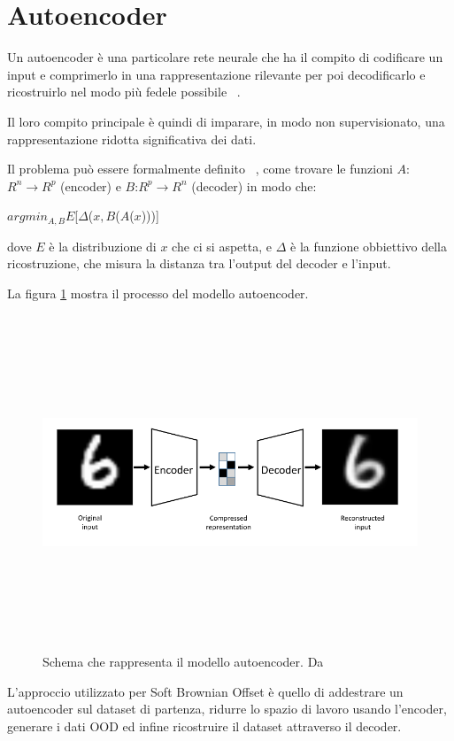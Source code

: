 \section{Autoencoder} 

Un autoencoder è una particolare rete neurale che ha il compito di codificare un input e comprimerlo in una rappresentazione rilevante per poi decodificarlo e ricostruirlo nel modo più fedele possibile ~\cite{bankAutoencoders2021}.

Il loro compito principale è quindi di imparare, in modo non supervisionato, una rappresentazione ridotta significativa dei dati.

Il problema può essere formalmente definito ~\cite{baldiAutoencodersUnsupervisedLearning}, come trovare le funzioni $A$:$ R^{n} \rightarrow R^p$ (encoder) e $B$:$ R^{p} \rightarrow R^n$ (decoder) in modo che:

\begin{center}
$arg min_{A,B} E$[$\Delta$($x,  B$($A$($x$)))] \\
\end{center}

dove $E$ è la distribuzione di $x$ che ci si aspetta, e $\Delta$ è la funzione obbiettivo della ricostruzione, che misura la distanza tra l'output del decoder e l'input.

La figura \ref{fig:ae_schema} mostra il processo del modello autoencoder.

\begin{figure}[htpb]
    \centering
    \includegraphics[width=\textwidth,height=10cm,keepaspectratio=true]{img/ae_schema.png}
    \caption{
        Schema che rappresenta il modello autoencoder. Da ~\cite{baldiAutoencodersUnsupervisedLearning}
    }
    \label{fig:ae_schema}
\end{figure}


L'approccio utilizzato per Soft Brownian Offset è quello di addestrare un autoencoder sul dataset di partenza, ridurre lo spazio di lavoro usando l'encoder, generare i dati OOD ed infine ricostruire il dataset attraverso il decoder.


